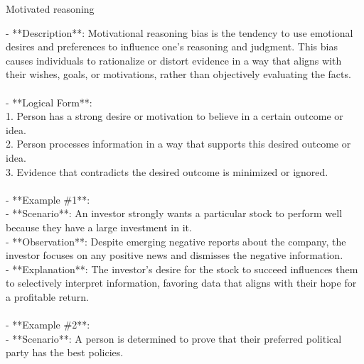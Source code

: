 \documentclass[a4paper,12pt,single,pdftex]{scrartcl}
\begin{document}
Motivated reasoning
    
      - **Description**: Motivational reasoning bias is the tendency to use emotional desires and preferences to influence one's reasoning and judgment. This bias causes individuals to rationalize or distort evidence in a way that aligns with their wishes, goals, or motivations, rather than objectively evaluating the facts.
    \\

    
      
    \\

    
      - **Logical Form**:
    \\

    
        1. Person has a strong desire or motivation to believe in a certain outcome or idea.
    \\

    
        2. Person processes information in a way that supports this desired outcome or idea.
    \\

    
        3. Evidence that contradicts the desired outcome is minimized or ignored.
    \\

    
      
    \\

    
      - **Example \#1**:
    \\

    
        - **Scenario**: An investor strongly wants a particular stock to perform well because they have a large investment in it.
    \\

    
        - **Observation**: Despite emerging negative reports about the company, the investor focuses on any positive news and dismisses the negative information.
    \\

    
        - **Explanation**: The investor’s desire for the stock to succeed influences them to selectively interpret information, favoring data that aligns with their hope for a profitable return.
    \\

    
      
    \\

    
      - **Example \#2**:
    \\

    
        - **Scenario**: A person is determined to prove that their preferred political party has the best policies.
    \\
\end{document}

